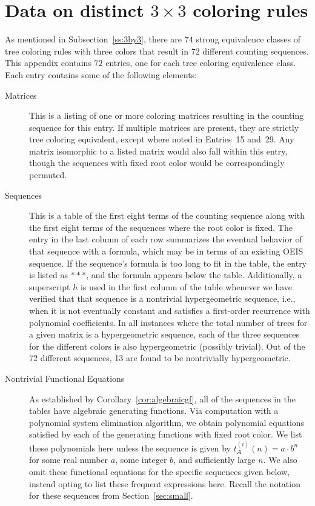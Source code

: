 \documentclass[12pt]{amsart}
\begin{document}
\section{Data on distinct $3\times3$ coloring rules}\label{app:3by3}
As mentioned in Subsection~\ref{ss:3by3}, there are $74$ strong equivalence classes of tree coloring rules with three colors that result in $72$ different counting sequences. This appendix contains $72$ entries, one for each tree coloring equivalence class. Each entry contains some of the following elements:
\begin{description}
    \item[Matrices] This is a listing of one or more coloring matrices resulting in the counting sequence for this entry. If multiple matrices are present, they are strictly tree coloring equivalent, 
    except where noted in Entries~15 and~29. Any matrix 
    isomorphic to a listed matrix would also fall within this entry, though the sequences with fixed root color would be correspondingly permuted.
    \item[Sequences] This is a table of the first eight terms of the counting sequence along with the first eight terms of the sequences where the root color is fixed. The entry in the last column of each row summarizes the eventual behavior of that sequence with a formula, which may be in terms of an existing OEIS sequence. 
    If the sequence's formula is too long to fit in the table, the entry is listed as $***$, and the formula appears below the table. Additionally, a superscript $h$ is used in the first column of the table whenever we have verified that that sequence is a nontrivial hypergeometric sequence, i.e., when it is not eventually constant and satisfies a first-order recurrence with polynomial coefficients. In all instances where the total number of trees for a given matrix is a hypergeometric sequence, each of the three sequences for the different colors is also hypergeometric (possibly trivial). Out of the 72 different sequences, 13 are found to be nontrivially hypergeometric. 
    \item[Nontrivial Functional Equations] As established by Corollary~\ref{cor:algebraicgf}, all of the sequences in the tables have algebraic generating functions. Via computation with a polynomial system elimination algorithm, we obtain polynomial equations satisfied by each of the generating functions with fixed root color. We list these polynomials here unless the sequence is given by $t_A^{(i)}(n)=a\cdot b^{n}$ for some real number $a$, some integer $b$, and sufficiently large $n$. We also omit these functional equations for the specific sequences given below, instead opting to list these frequent expressions here. Recall the notation for these sequences from Section~\ref{sec:small}.

\end{description}
\end{document}
